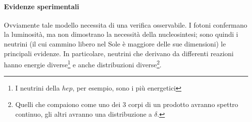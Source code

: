 \paragraph{Evidenze sperimentali} Ovviamente tale modello necessita di una verifica osservabile. I fotoni confermano la luminosità, ma non dimostrano la necessità della nucleosintesi; sono quindi i neutrini (il cui cammino libero nel Sole è maggiore delle sue dimensioni) le principali evidenze. In particolare, neutrini che derivano da differenti reazioni hanno energie diverse\footnote{I neutrini della $hep$, per esempio, sono i più energetici} e anche distribuzioni diverse\footnote{Quelli che compaiono come uno dei 3 corpi di un prodotto avranno spettro continuo, gli altri avranno una distribuzione a $\delta$.}. 


